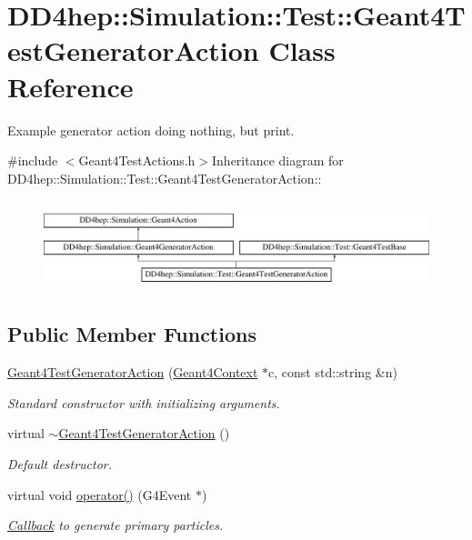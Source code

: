 \hypertarget{class_d_d4hep_1_1_simulation_1_1_test_1_1_geant4_test_generator_action}{
\section{DD4hep::Simulation::Test::Geant4TestGeneratorAction Class Reference}
\label{class_d_d4hep_1_1_simulation_1_1_test_1_1_geant4_test_generator_action}
}


Example generator action doing nothing, but print.  


{\ttfamily \#include $<$Geant4TestActions.h$>$}Inheritance diagram for DD4hep::Simulation::Test::Geant4TestGeneratorAction::\begin{figure}[H]
\begin{center}
\leavevmode
\includegraphics[height=2.625cm]{class_d_d4hep_1_1_simulation_1_1_test_1_1_geant4_test_generator_action}
\end{center}
\end{figure}
\subsection*{Public Member Functions}
\begin{DoxyCompactItemize}
\item 
\hyperlink{class_d_d4hep_1_1_simulation_1_1_test_1_1_geant4_test_generator_action_a7bbaab8b38a9771b99190c270fedb637}{Geant4TestGeneratorAction} (\hyperlink{class_d_d4hep_1_1_simulation_1_1_geant4_context}{Geant4Context} $\ast$c, const std::string \&n)
\begin{DoxyCompactList}\small\item\em Standard constructor with initializing arguments. \item\end{DoxyCompactList}\item 
virtual \hyperlink{class_d_d4hep_1_1_simulation_1_1_test_1_1_geant4_test_generator_action_a41570e16f5e7aa86d68cf44764feb852}{$\sim$Geant4TestGeneratorAction} ()
\begin{DoxyCompactList}\small\item\em Default destructor. \item\end{DoxyCompactList}\item 
virtual void \hyperlink{class_d_d4hep_1_1_simulation_1_1_test_1_1_geant4_test_generator_action_af50b716c4764ffa0bf42c4b01ee3d394}{operator()} (G4Event $\ast$)
\begin{DoxyCompactList}\small\item\em \hyperlink{class_d_d4hep_1_1_callback}{Callback} to generate primary particles. \item\end{DoxyCompactList}\end{DoxyCompactItemize}



